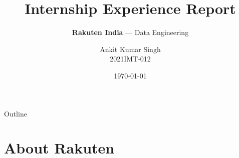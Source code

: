 \documentclass{beamer}
\title[\textcolor{white}{Internship Report}]{\textbf{Internship Experience Report}}
\subtitle{\textcolor{LightGold}{\textbf{Rakuten India} --- Data Engineering}}
\author{Ankit Kumar Singh \\ 2021IMT-012}
\institute{ABV--IIITM Gwalior}
\date{\today}
\begin{document}
\begin{frame}
  \titlepage
\end{frame}

\begin{frame}{Outline}
  \tableofcontents
\end{frame}

\section{About Rakuten}
\end{document}
